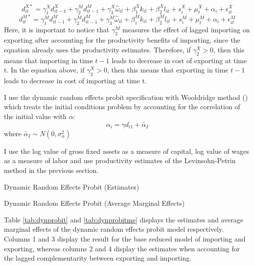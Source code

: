 \documentclass[12pt]{article}
\begin{document}
\begin{equation}
d_{it}^{X*}=   \gamma_{1}^{X} d_{it-1}^{X} + \gamma_{2}^{M} d_{it-1}^{M}+
\gamma_{3}^{X} \hat{\omega}_{it}  + \beta_{1}^{X}k_{it}  +\beta_{2}^{X}l_{it}+
s_{i}^{X} + \mu_{t}^{X}  + \alpha_{i}+ \epsilon_{it}^{X}
\end{equation}
\begin{equation}
d_{it}^{M*}=   \gamma_{1}^{M} d_{it-1}^{M} + \gamma_{2}^{M} d_{it-1}^{M}+
\gamma_{3}^{M} \hat{\omega}_{it}  + \beta_{1}^{M}k_{it}  +\beta_{2}^{M}l_{it}+
s_{i}^{M} + \mu_{t}^{M}  + \alpha_{i}+ \epsilon_{it}^{M}
\end{equation}
Here, it is important to notice that  $\gamma_{2}^{M}$ measures the effect of lagged importing on
exporting after accounting for the productivity benefits of importing,
since the equation already uses the productivity
estimates. Therefore, if $\gamma_{2}^{X}>0$, then this means that
importing in time $t-1$ leads to decrease in cost of exporting at time t.  
In the equation above, if  $\gamma_{2}^{X}>0$, then this means that
exporting in time $t-1$ leads to decrease in cost of importing at time t.
  
I use the dynamic random effects probit specification with Wooldridge
method (\textcite{wooldridge2005simple}) which treats the initial conditions problem by accounting for
the correlation of the initial value with $\alpha$:
$$  \alpha_{i}= \gamma d_{i1}+ \tilde{\alpha_{I}} $$
where $ \tilde{\alpha_{I}} \sim N(0, \sigma_{\alpha}^{2}) $

I use the log value of gross fixed assets as a measure of capital, log
value of wages as a measure of labor and use productivity estimates  of
the Levinsohn-Petrin method in the previous section. 

\begin{center}
\begin{table}[H]
\caption{Dynamic Random Effects Probit (Estimates)}
\label{tab:dynprobit}

\end{table}
\end{center}

\begin{center}
\begin{table}[H]
\caption{Dynamic Random Effects Probit (Average Marginal Effects)}
\label{tab:dynprobitme}

\end{table}
\end{center}

Table \ref{tab:dynprobit} and \ref{tab:dynprobitme} displays the
estimates and average marginal effects of the dynamic random
effects probit model respectively. Columns 1 and 3 display the result for the base
reduced model of importing and exporting, whereas columns 2 and 4
display the estimates when accounting for the lagged complementarity
between exporting and importing.
\end{document}
